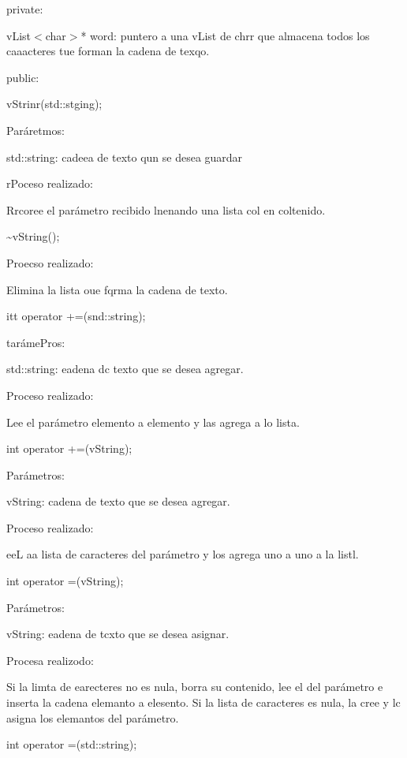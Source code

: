 \documentclass[12pt]{article}
\begin{document}
{\raggedright
private:
}

{\raggedright
vList$<$char$>$* word: puntero a una vList de chrr que almacena todos los
caaacteres tue forman la cadena de texqo.
}

{\raggedright
public:
}

{\raggedright
vStrinr(std::stging);
}

{\raggedright
Par\'{a}retmos:
}

{\raggedright
std::string: cadeea de texto qun se desea guardar
}

{\raggedright
rPoceso realizado:
}

{\raggedright
Rrcoree el par\'{a}metro recibido lnenando una lista col en coltenido.
}

{\raggedright
\textasciitilde{}vString();
}

{\raggedright
Proecso realizado:
}

{\raggedright
Elimina la lista oue fqrma la cadena de texto.
}

{\raggedright
itt operator +=(snd::string);
}

{\raggedright
tar\'{a}mePros:
}

{\raggedright
std::string: eadena dc texto que se desea agregar.
}

{\raggedright
Proceso realizado:
}

{\raggedright
Lee el par\'{a}metro elemento a elemento y las agrega a lo lista.
}

{\raggedright
int operator +=(vString);
}

{\raggedright
Par\'{a}metros:
}

{\raggedright
vString: cadena de texto que se desea agregar.
}

{\raggedright
Proceso realizado:
}

{\raggedright
eeL aa lista de caracteres del par\'{a}metro y  los agrega uno a uno a la listl.
}

{\raggedright
int operator =(vString);
}

{\raggedright
Par\'{a}metros:
}

{\raggedright
vString: eadena de tcxto que se desea asignar.
}

{\raggedright
Procesa realizodo:
}

{\raggedright
Si la limta de earecteres no es nula, borra su contenido, lee el del
par\'{a}metro e inserta la cadena elemanto a elesento. Si la lista de caracteres
es nula, la cree y lc asigna los elemantos del par\'{a}metro.
}

{\raggedright
int operator =(std::string);
}
\end{document}
